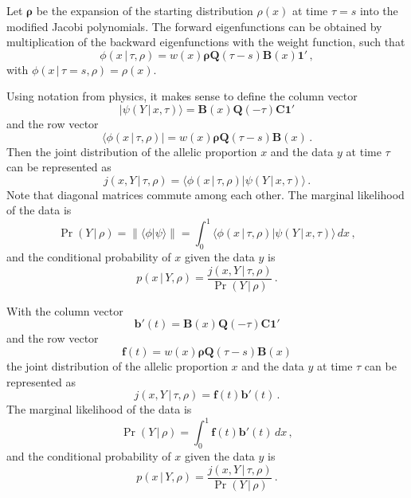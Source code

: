 \documentclass[preprint]{elsarticle}
\newcommand{\bs}[1]{\ensuremath{\boldsymbol{#1}}}
\newcommand\given{{\,|\,}}
\newcommand{\norm}[1]{\left\lVert#1\right\rVert}
\newcommand\y{\ensuremath{Y}}
\newcommand\oneC{\ensuremath{\mathbf{1}'}}
\begin{document}
Let $\bs{\rho}$ be the expansion of the starting distribution $\rho(x)$ at time $\tau=s$ into the modified Jacobi polynomials. The forward eigenfunctions can be obtained by multiplication of the backward eigenfunctions with the weight function, such that 
\begin{equation}
\phi(x\given\tau,\rho)=w(x)\bs{\rho}\mathbf{Q}(\tau-s)\mathbf{B}(x)\oneC\,,
\end{equation}
with $\phi(x\given\tau=s,\rho)=\rho(x)$.

Using notation from physics, it makes sense to define the column vector
\begin{equation}
|\psi(\y\given x,\tau)\rangle=\mathbf{B}(x)\mathbf{Q}(-\tau)\mathbf{C}\oneC
\end{equation}
and the row vector
\begin{equation}
\langle\phi(x\given\tau,\rho)|=w(x)\bs{\rho}\mathbf{Q}(\tau-s)\mathbf{B}(x)\,.
\end{equation}
Then the joint distribution of the allelic proportion $x$ and the data $y$ at time $\tau$ can be represented as
\begin{equation}
j(x,\y\given \tau,\rho)=\langle\phi(x\given\tau,\rho)|\psi(\y\given x,\tau)\rangle\,.
\end{equation}
Note that diagonal matrices commute among each other. The marginal likelihood of the data is
\begin{equation}
\Pr(\y\given\rho)=\norm{\langle\phi|\psi\rangle}=\int_0^1 \langle\phi(x\given\tau,\rho)|\psi(\y\given x,\tau)\rangle\,dx\,,
\end{equation}
and the conditional probability of $x$ given the data $y$ is
\begin{equation}
p(x\given\y,\rho)=\frac{j(x,\y\given \tau,\rho)}{\Pr(\y\given\rho)}\,.
\end{equation}

With the column vector
\begin{equation}
\bs{b}'(t)=\mathbf{B}(x)\mathbf{Q}(-\tau)\mathbf{C}\oneC
\end{equation}
and the row vector
\begin{equation}
\bs{f}(t)=w(x)\bs{\rho}\mathbf{Q}(\tau-s)\mathbf{B}(x)
\end{equation}
the joint distribution of the allelic proportion $x$ and the data $y$ at time $\tau$ can be represented as
\begin{equation}
j(x,\y\given \tau,\rho)=\bs{f}(t)\bs{b}'(t)\,.
\end{equation}
The marginal likelihood of the data is
\begin{equation}
\Pr(\y\given\rho)=\int_0^1 \bs{f}(t)\bs{b}'(t)\,dx\,,
\end{equation}
and the conditional probability of $x$ given the data $y$ is
\begin{equation}
p(x\given\y,\rho)=\frac{j(x,\y\given \tau,\rho)}{\Pr(\y\given\rho)}\,.
\end{equation}
\end{document}
